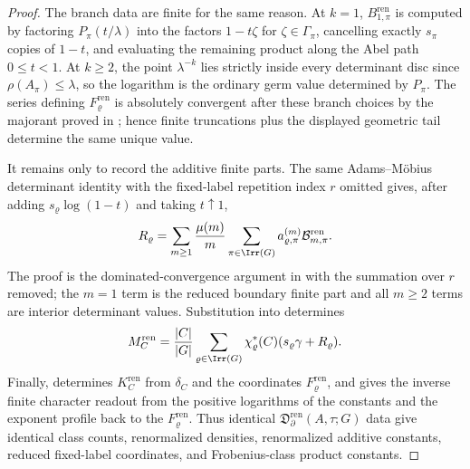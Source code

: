 \begin{proof}
  The branch data are finite for the same reason.  At \(k=1\),
  \(B_{1,\pi}^{\mathrm{ren}}\) is computed by factoring
  \(P_\pi(t/\lambda)\) into the factors \(1-t\zeta\) for
  \(\zeta\in\Gamma_\pi\), cancelling exactly \(s_\pi\) copies of \(1-t\),
  and evaluating the remaining product along the Abel path \(0\le t<1\).
  At \(k\ge2\), the point \(\lambda^{-k}\) lies strictly inside every
  determinant disc since \(\rho(A_\pi)\le\lambda\), so the logarithm is the
  ordinary germ value determined by \(P_\pi\).  The series defining
  \(F_\varrho^{\mathrm{ren}}\) is absolutely convergent after these branch
  choices by the majorant proved in
  ; hence finite
  truncations plus the displayed geometric tail determine the same unique
  value.

  It remains only to record the additive finite parts.  The same
  Adams--M\"obius determinant identity with the fixed-label repetition index
  \(r\) omitted gives, after adding \(s_\varrho\log(1-t)\) and taking
  \(t\uparrow1\),
  \[
    R_\varrho
    =
    \sum_{m\ge1}\frac{\mu(m)}{m}
      \sum_{\pi\in\Irr(G)}
        a_{\varrho,\pi}^{(m)}
        \mathcal B_{m,\pi}^{\mathrm{ren}}.
  \]
  The proof is the dominated-convergence argument in
   with the summation over
  \(r\) removed; the \(m=1\) term is the reduced boundary finite part and
  all \(m\ge2\) terms are interior determinant values.  Substitution into
   determines
  \[
    M_C^{\mathrm{ren}}
    =
    \frac{|C|}{|G|}
      \sum_{\varrho\in\Irr(G)}
        \chi_\varrho^\ast(C)(s_\varrho\gamma+R_\varrho).
  \]
  Finally,
   determines \(K_C^{\mathrm{ren}}\)
  from \(\delta_C\) and the coordinates \(F_\varrho^{\mathrm{ren}}\), and
   gives the inverse finite
  character readout from the positive logarithms of the constants and the
  exponent profile back to the \(F_\varrho^{\mathrm{ren}}\).  Thus identical
  \(\mathfrak D_{\partial}^{\mathrm{ren}}(A,\tau;G)\) data give identical
  class counts, renormalized densities, renormalized additive constants,
  reduced fixed-label coordinates, and Frobenius-class product constants.
\end{proof}

